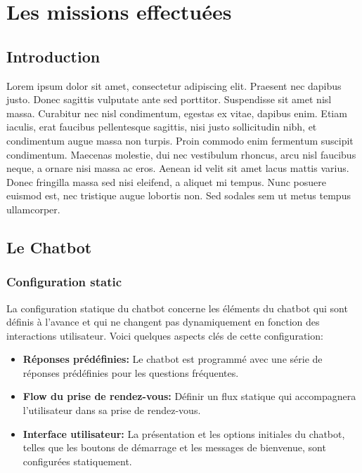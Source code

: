 \chapter{Les missions effectuées}
\label{chap:Chapter 4 title}
\section*{Introduction}

Lorem ipsum dolor sit amet, consectetur adipiscing elit. Praesent nec dapibus justo. Donec sagittis vulputate ante sed porttitor. Suspendisse sit amet nisl massa. Curabitur nec nisl condimentum, egestas ex vitae, dapibus enim. Etiam iaculis, erat faucibus pellentesque sagittis, nisi justo sollicitudin nibh, et condimentum augue massa non turpis. Proin commodo enim fermentum suscipit condimentum. Maecenas molestie, dui nec vestibulum rhoncus, arcu nisl faucibus neque, a ornare nisi massa ac eros. Aenean id velit sit amet lacus mattis varius. Donec fringilla massa sed nisi eleifend, a aliquet mi tempus. Nunc posuere euismod est, nec tristique augue lobortis non. Sed sodales sem ut metus tempus ullamcorper.
      




\pagebreak

\section{Le Chatbot}

\subsection{Configuration static}

\hspace{16pt}La configuration statique du chatbot concerne les éléments du chatbot qui sont définis à l'avance et qui ne changent pas dynamiquement en fonction des interactions utilisateur. Voici quelques aspects clés de cette configuration:

\begin{itemize}
  \item \textbf{Réponses prédéfinies: }Le chatbot est programmé avec une série de réponses prédéfinies pour les questions fréquentes.
  \item \textbf{Flow du prise de rendez-vous: }Définir un flux statique qui accompagnera l'utilisateur dans sa prise de rendez-vous.
  \item \textbf{Interface utilisateur: }La présentation et les options initiales du chatbot, telles que les boutons de démarrage et les messages de bienvenue, sont configurées statiquement.
\end{itemize}

